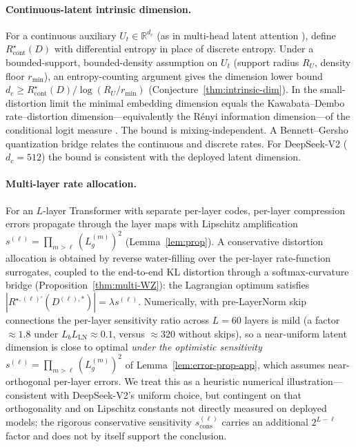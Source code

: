 \documentclass[11pt]{article}
\newcommand{\R}{\mathbb{R}}
\theoremstyle{plain}
\theoremstyle{definition}
\theoremstyle{remark}
\begin{document}
\paragraph{Continuous-latent intrinsic dimension.}
For a continuous auxiliary $U_t \in \R^{d_c}$ (as in multi-head
latent attention \citep{deepseek2024mla}), define
$R^\star_{\mathrm{cont}}(D)$ with differential entropy in place of
discrete entropy. Under a bounded-support, bounded-density
assumption on $U_t$ (support radius $R_U$, density floor
$r_{\min}$), an entropy-counting argument gives the dimension lower
bound $d_c \geq R^\star_{\mathrm{cont}}(D)/\log(R_U/r_{\min})$
(Conjecture~\ref{thm:intrinsic-dim}). In the small-distortion limit
the minimal embedding dimension equals the Kawabata--Dembo
rate--distortion dimension---equivalently the R\'enyi information
dimension---of the conditional logit measure
\citep{kawabata1994rate,geiger2016rate}. The bound is
mixing-independent. A Bennett--Gersho quantization bridge
\citep{bennett1948spectra,gersho1979asymptotically} relates the
continuous and discrete rates. For DeepSeek-V2 ($d_c = 512$) the
bound is consistent with the deployed latent dimension.

\paragraph{Multi-layer rate allocation.}
For an $L$-layer Transformer with separate per-layer codes,
per-layer compression errors propagate through the layer maps with
Lipschitz amplification $s^{(\ell)} = \prod_{m>\ell}(L_g^{(m)})^2$
(Lemma~\ref{lem:prop}). A conservative distortion allocation is
obtained by reverse water-filling over the per-layer
rate-function surrogates, coupled to the end-to-end KL distortion
through a softmax-curvature bridge
(Proposition~\ref{thm:multi-WZ}): the Lagrangian optimum satisfies
$|R^{\star,(\ell)\prime}(D^{(\ell),*})| = \lambda s^{(\ell)}$.
Numerically, with pre-LayerNorm skip connections the per-layer
sensitivity ratio across $L = 60$ layers is mild (a factor
$\approx 1.8$ under $L_b L_{\mathrm{LN}} \approx 0.1$, versus
$\approx 320$ without skips), so a near-uniform latent dimension is
close to optimal \emph{under the optimistic sensitivity}
$s^{(\ell)}=\prod_{m>\ell}(L_g^{(m)})^2$ of
Lemma~\ref{lem:error-prop-app}, which assumes near-orthogonal
per-layer errors. We treat this as a heuristic numerical
illustration---consistent with DeepSeek-V2's uniform choice, but
contingent on that orthogonality and on Lipschitz constants not
directly measured on deployed models; the rigorous conservative
sensitivity $s^{(\ell)}_{\mathrm{cons}}$ carries an additional
$2^{L-\ell}$ factor and does not by itself support the conclusion.
\end{document}
